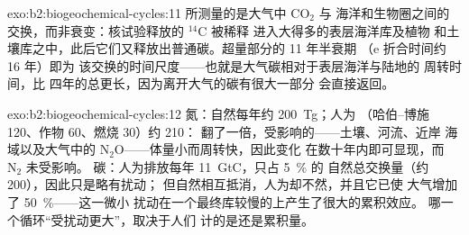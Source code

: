 \begin{solution}{exo:b2:biogeochemical-cycles:11}
所测量的是大气中 $\mathrm{CO_2}$ 与
海洋和生物圈之间的交换，而非衰变：核试验释放的 $\mathrm{{}^{14}C}$ 被稀释
进入大得多的表层海洋库及植物
和土壤库之中，此后它们又释放出普通碳。超量部分的 11 年半衰期
（e 折合时间约 16 年）即为
该交换的时间尺度——也就是大气碳相对于表层海洋与陆地的
周转时间，比
四年的总更长，因为离开大气的碳有很大一部分
会直接返回。
\end{solution}

\begin{solution}{exo:b2:biogeochemical-cycles:12}
氮：自然每年约 200~Tg；人为
（哈伯–博施 120、作物 60、燃烧 30）约 210：
翻了一倍，受影响的——土壤、河流、近岸
海域以及大气中的 $\mathrm{N_2O}$——体量小而周转快，因此变化
在数十年内即可显现，而 $\mathrm{N_2}$ 未受影响。
碳：人为排放每年 11~GtC，只占 \qty{5}{\%} 的
自然总交换量（约 200），因此只是略有扰动；
但自然相互抵消，人为却不然，并且它已使
大气增加了 \qty{50}{\%}——这一微小
扰动在一个最终库较慢的上产生了很大的累积效应。
哪一个循环“受扰动更大”，取决于人们
计的是还是累积量。
\end{solution}

